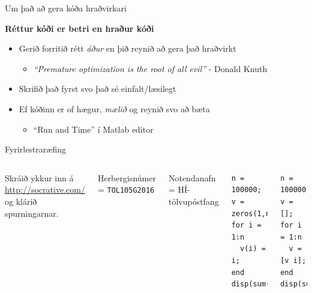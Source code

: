 \documentclass{beamer}
\begin{document}
\begin{frame}{Um það að gera kóða hraðvirkari}
\begin{center}
\large \textbf{Réttur kóði er betri en hraður kóði}
\end{center}
\begin{itemize}
 \item Gerið forritið rétt \emph{áður} en þið reynið að gera það hraðvirkt
 \begin{itemize}
  \item \emph{``Premature optimization is the root of all evil''} - Donald Knuth
 \end{itemize}
 \item Skrifið það fyrst svo það sé einfalt/læsilegt
 \item Ef kóðinn er of hægur, \emph{mælið} og reynið svo að bæta
 \begin{itemize}
  \item ``Run and Time'' í Matlab editor
 \end{itemize}
\end{itemize}
\end{frame}

\begin{frame}[fragile]{Fyrirlestraræfing}
\vspace{\baselineskip}
\begin{columns}
Skráið ykkur inn á \url{http://socrative.com/} og klárið spurningarnar.

Herbergisnúmer = \texttt{TOL105G2016}

Notendanafn = HÍ-tölvupóstfang
\begin{verbatim}
n = 100000; v = zeros(1,n);
for i = 1:n
  v(i) = i;
end
disp(sum(v))
\end{verbatim}
\begin{verbatim}
n = 100000;  v = [];
for i = 1:n
  v = [v i];
end
disp(sum(v))
\end{verbatim}

\end{columns}

\end{frame}
\end{document}
